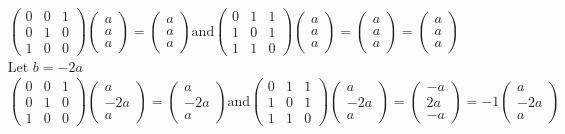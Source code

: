 \begin{enumerate}
\begin{answer}
\begin{align*}
	&\left(\begin{array}{lll}0 & 0 & 1 \\ 0 & 1 & 0 \\ 1 & 0 & 0\end{array}\right)\left(\begin{array}{l}a \\ a \\ a\end{array}\right)=\left(\begin{array}{l}a \\ a \\ a\end{array}\right) \text{and} \left(\begin{array}{lll}0 & 1 & 1 \\ 1 & 0 & 1 \\ 1 & 1 & 0\end{array}\right)\left(\begin{array}{l}a \\ a \\ a\end{array}\right)=\left(\begin{array}{l}a \\ a \\ a\end{array}\right)=\left(\begin{array}{l}a \\ a \\ a\end{array}\right)\\
	&\text{Let }b=-2 a\\
	&\left(\begin{array}{lll}0 & 0 & 1 \\ 0 & 1 & 0 \\ 1 & 0 & 0\end{array}\right)\left(\begin{array}{c}a \\ -2 a \\ a\end{array}\right)=\left(\begin{array}{c}a \\ -2 a \\ a\end{array}\right)\text{and} \left(\begin{array}{lll}0 & 1 & 1 \\ 1 & 0 & 1 \\ 1 & 1 & 0\end{array}\right)\left(\begin{array}{c}a \\ -2 a \\ a\end{array}\right)=\left(\begin{array}{c}-a \\ 2 a \\ -a\end{array}\right)=-1\left(\begin{array}{c}a \\ -2 a \\ a\end{array}\right)

\end{align*}
\end{answer}
\end{enumerate}
